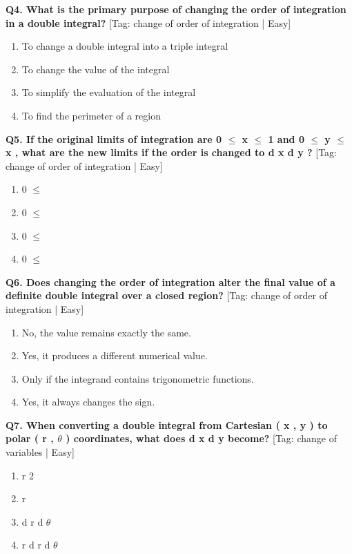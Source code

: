 \noindent\textbf{Q4. What is the primary purpose of changing the order of integration in a double integral?} \hfill [Tag: change of order of integration | Easy]
\begin{enumerate}[label=(\alph*),topsep=2pt,itemsep=1pt,partopsep=0pt,parsep=0pt]
    \item {{To change a double integral into a triple integral}}
    \item {{To change the value of the integral}}
    \item {{To simplify the evaluation of the integral}}
    \item {{To find the perimeter of a region}}
\end{enumerate}
\vspace{2mm}

\noindent\textbf{Q5. If the original limits of integration are 0 $\le$ x $\le$ 1 and 0 $\le$ y $\le$ x , what are the new limits if the order is changed to d x d y ?} \hfill [Tag: change of order of integration | Easy]
\begin{enumerate}[label=(\alph*),topsep=2pt,itemsep=1pt,partopsep=0pt,parsep=0pt]
    \item {{0 $\le$}}
    \item {{0 $\le$}}
    \item {{0 $\le$}}
    \item {{0 $\le$}}
\end{enumerate}
\vspace{2mm}

\noindent\textbf{Q6. Does changing the order of integration alter the final value of a definite double integral over a closed region?} \hfill [Tag: change of order of integration | Easy]
\begin{enumerate}[label=(\alph*),topsep=2pt,itemsep=1pt,partopsep=0pt,parsep=0pt]
    \item {{No, the value remains exactly the same.}}
    \item {{Yes, it produces a different numerical value.}}
    \item {{Only if the integrand contains trigonometric functions.}}
    \item {{Yes, it always changes the sign.}}
\end{enumerate}
\vspace{2mm}

\noindent\textbf{Q7. When converting a double integral from Cartesian ( x , y ) to polar ( r , $\theta$ ) coordinates, what does d x d y become?} \hfill [Tag: change of variables | Easy]
\begin{enumerate}[label=(\alph*),topsep=2pt,itemsep=1pt,partopsep=0pt,parsep=0pt]
    \item {{r 2}}
    \item {{r}}
    \item {{d r d $\theta$}}
    \item {{r d r d $\theta$}}
\end{enumerate}
\vspace{2mm}

